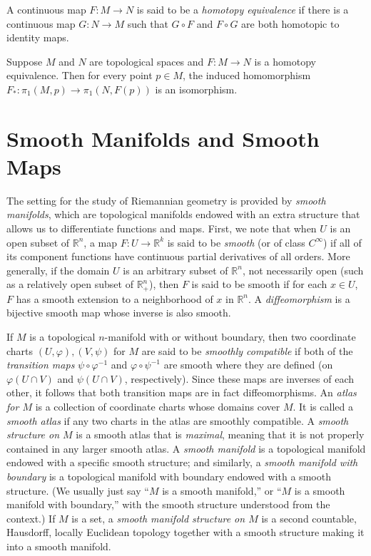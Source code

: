 A continuous map $F: M \to N$ is said to be a \emph{homotopy equivalence} if there is
a continuous map $G: N \to M$ such that $G \circ F$ and $F \circ G$ are both homotopic to
identity maps.

\begin{proposition}
\label{prop:homotopy-invariance-fundamental-group}
Suppose $M$ and $N$ are topological spaces and $F: M \to N$ is a
homotopy equivalence. Then for every point $p \in M$, the induced homomorphism
$F_*: \pi_1(M, p) \to \pi_1(N, F(p))$ is an isomorphism.
\end{proposition}

\section{Smooth Manifolds and Smooth Maps}

The setting for the study of Riemannian geometry is provided by \emph{smooth manifolds}, which are topological manifolds endowed with an extra structure that allows us to differentiate functions and maps. First, we note that when $U$ is an open subset of $\mathbb{R}^n$, a map $F : U \to \mathbb{R}^k$ is said to be \emph{smooth} (or of class $C^\infty$) if all of its component functions have continuous partial derivatives of all orders. More generally, if the domain $U$ is an arbitrary subset of $\mathbb{R}^n$, not necessarily open (such as a relatively open subset of $\mathbb{R}^n_+$), then $F$ is said to be smooth if for each $x \in U$, $F$ has a smooth extension to a neighborhood of $x$ in $\mathbb{R}^n$. A \emph{diffeomorphism} is a bijective smooth map whose inverse is also smooth.

If $M$ is a topological $n$-manifold with or without boundary, then two coordinate charts $(U, \varphi), (V, \psi)$ for $M$ are said to be \emph{smoothly compatible} if both of the \emph{transition maps} $\psi \circ \varphi^{-1}$ and $\varphi \circ \psi^{-1}$ are smooth where they are defined (on $\varphi(U \cap V)$ and $\psi(U \cap V)$, respectively). Since these maps are inverses of each other, it follows that both transition maps are in fact diffeomorphisms. An \emph{atlas for $M$} is a collection of coordinate charts whose domains cover $M$. It is called a \emph{smooth atlas} if any two charts in the atlas are smoothly compatible. A \emph{smooth structure on $M$} is a smooth atlas that is \emph{maximal}, meaning that it is not properly contained in any larger smooth atlas. A \emph{smooth manifold} is a topological manifold endowed with a specific smooth structure; and similarly, a \emph{smooth manifold with boundary} is a topological manifold with boundary endowed with a smooth structure. (We usually just say ``$M$ is a smooth manifold,'' or ``$M$ is a smooth manifold with boundary,'' with the smooth structure understood from the context.) If $M$ is a set, a \emph{smooth manifold structure on $M$} is a second countable, Hausdorff, locally Euclidean topology together with a smooth structure making it into a smooth manifold.

